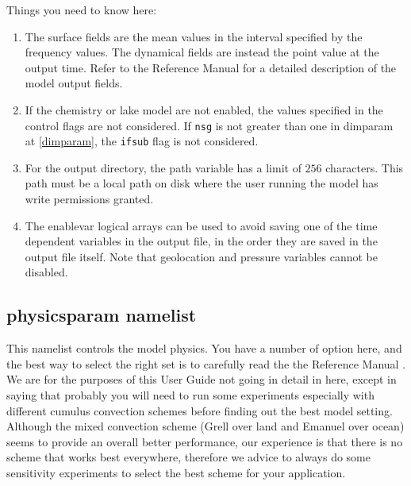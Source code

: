 Things you need to know here:

\begin{enumerate}
\item The surface fields are the mean values in the interval specified by
the frequency values. The dynamical fields are instead the point value at the
output time. Refer to the Reference Manual \cite{refman_11} for a detailed
description of the model output fields.
\item If the chemistry or lake model are not enabled, the values specified in
the control flags are not considered. If \verb=nsg= is not greater than one
in dimparam at \ref{dimparam}, the \verb=ifsub= flag is not considered.
\item For the output directory, the path variable has a limit of $256$
characters. This path must be a local path on disk where the user running
the model has write permissions granted.
\item The enablevar logical arrays can be used to avoid saving one of the time
dependent variables in the output file, in the order they are saved in the
output file itself. Note that geolocation and pressure variables cannot be
disabled.
\end{enumerate}

\subsection{physicsparam namelist}
\label{physicsparam}

This namelist controls the model physics. You have a number of option here,
and the best way to select the right set is to carefully read the the
Reference Manual \cite{refman_11}. We are for the purposes of this User Guide
not going in detail in here, except in saying that probably you will need
to run some experiments especially with different cumulus convection
schemes before finding out the best model setting.
Although the mixed convection scheme (Grell over land and Emanuel over ocean)
seems to provide an overall better performance, our experience is that there
is no scheme that works best everywhere, therefore we advice to always do some
sensitivity experiments to select the best scheme for your application.

